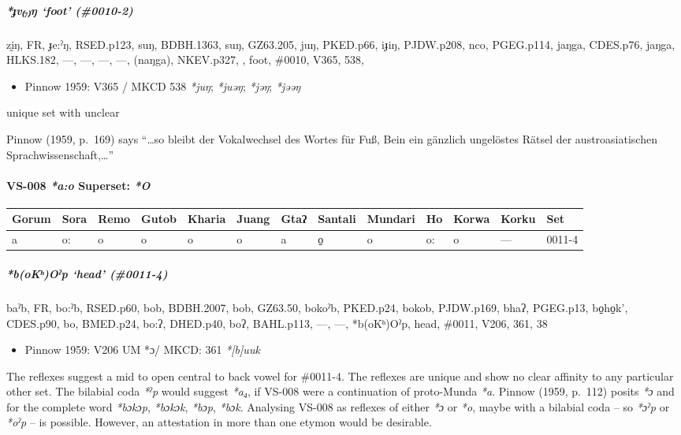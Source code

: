 \documentclass[a4paper,]{article}
\providecommand{\tightlist}{%
  \setlength{\itemsep}{0pt}\setlength{\parskip}{0pt}}
\let\oldparagraph\paragraph
\renewcommand{\paragraph}[1]{\oldparagraph{#1}\mbox{}}
\let\oldsubparagraph\subparagraph
\renewcommand{\subparagraph}[1]{\oldsubparagraph{#1}\mbox{}}
\begin{document}
\subparagraph{\texorpdfstring{\emph{*ɟv₍₇₎ŋ} `foot'
(\#0010-2)}{*ɟv₍₇₎ŋ foot (\#0010-2)}}\label{ux25fvux14b-foot-0010-2}

zḭŋ, FR, ɟe:ˀŋ, RSED.p123, suŋ, BDBH.1363, suŋ, GZ63.205, juŋ, PKED.p66,
iɟiŋ, PJDW.p208, nco, PGEG.p114, jaŋga, CDES.p76, jaŋga, HLKS.182, ---,
---, ---, ---, (naŋga), NKEV.p327, , foot, \#0010, V365, 538,

\begin{itemize}
\tightlist
\item
  Pinnow 1959: V365 / MKCD 538 \emph{*juŋ}; \emph{*juəŋ}; \emph{*jəŋ};
  \emph{*jəəŋ}
\end{itemize}

unique set with unclear

Pinnow (1959, p.~169) says ``\ldots{}so bleibt der Vokalwechsel des
Wortes für Fuß, Bein ein gänzlich ungelöstes Rätsel der
austroasiatischen Sprachwissenschaft,\ldots{}''

\paragraph{\texorpdfstring{VS-008 \emph{*a:o} Superset:
\emph{*O}}{VS-008 *a:o Superset: *O}}\label{vs-008-ao-superset-o}

\begin{longtable}[]{@{}lllllllllllll@{}}
\toprule
Gorum & Sora & Remo & Gutob & Kharia & Juang & Gtaʔ & Santali & Mundari
& Ho & Korwa & Korku & Set\tabularnewline
\midrule
\endhead
a & o: & o & o & o & o & a & o̠ & o & o: & o & --- &
0011-4\tabularnewline
\bottomrule
\end{longtable}

\subparagraph{\texorpdfstring{\emph{*b(oKʰ)Oˀp} `head'
(\#0011-4)}{*b(oKʰ)Oˀp head (\#0011-4)}}\label{bokux2b0oux2c0p-head-0011-4}

baˀb, FR, bo:ˀb, RSED.p60, bob, BDBH.2007, bob, GZ63.50, bokoˀb,
PKED.p24, bokob, PJDW.p169, bhaʔ, PGEG.p13, bo̠ho̠k', CDES.p90, bo,
BMED.p24, bo:ʔ, DHED.p40, boʔ, BAHL.p113, ---, ---, *b(oKʰ)Oˀp, head,
\#0011, V206, 361, 38

\begin{itemize}
\tightlist
\item
  Pinnow 1959: V206 UM *ɔ/ MKCD: 361 \emph{*{[}b{]}uuk}
\end{itemize}

The reflexes suggest a mid to open central to back vowel for \#0011-4.
The reflexes are unique and show no clear affinity to any particular
other set. The bilabial coda \emph{*ˀp} would suggest \emph{*a₄}, if
VS-008 were a continuation of proto-Munda \emph{*a}. Pinnow (1959,
p.~112) posits \emph{*ɔ} and for the complete word \emph{*bɔkɔp},
\emph{*bɔkɔk}, \emph{*bɔp}, \emph{*bɔk}. Analysing VS-008 as reflexes of
either \emph{*ɔ} or \emph{*o}, maybe with a bilabial coda -- so
\emph{*ɔˀp} or \emph{*oˀp} -- is possible. However, an attestation in
more than one etymon would be desirable.
\end{document}
